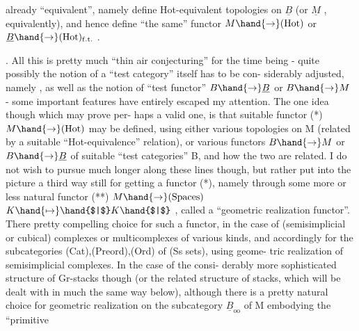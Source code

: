 already ``equivalent'', namely define Hot-equivalent topologies on $\underline{B}$ (or 
$\underline{M}$ , equivalently), and hence define ``the same'' functor $M \hand{\to} (\mathrm{Hot})$ or
$\underline{B} \hand{\to} (\mathrm{Hot})_{\mathrm{f.t.}}$ .

.  All this is pretty much ``thin air conjecturing'' for the time being
- quite possibly the notion of a ``test category'' itself has to be con-%
siderably adjusted, namely , as well as the notion of 
``test functor'' $B \hand{\to} \underline{B}$ or $B \hand{\to} M$ -  some important features  have
entirely escaped my attention. The one idea though which may prove per-%
haps a valid one, is that  suitable  functor
(*) \qquad $M \hand{\to} (\mathrm{Hot})$
may be defined, using either various topologies on M (related by a
suitable ``Hot-equivalence'' relation), or various functors $B \hand{\to} M$ or
$B \hand{\to} \underline{B}$ of suitable ``test categories'' B, and how the two are related.
I do not wish to pursue much longer along these lines though, but
rather put  into the picture a third way still for getting a functor
(*), namely through some more or less natural functor
(**) \qquad $M \hand{\to} (\mathrm{Spaces})$ \hand{,} \qquad $K \hand{\mapsto} \hand{$|$}K\hand{$|$}$ ,
called a ``geometric  realization functor''. There  pretty compelling
choice for such a functor, in the case of (semisimplicial or cubical)
complexes or multicomplexes of various kinds, and accordingly for
the subcategories (Cat),(Preord),(Ord) of  (Ss sets), using geome-%
tric realization of semisimplicial complexes. In the case of the consi-%
derably more sophisticated structure of Gr-stacks though (or the related
structure of stacks, which will be dealt with in much the same way
below), although there is a pretty natural choice for geometric
realization on the subcategory $\underline{B}_{\mathrm{oo}}$  of M embodying the ``primitive
